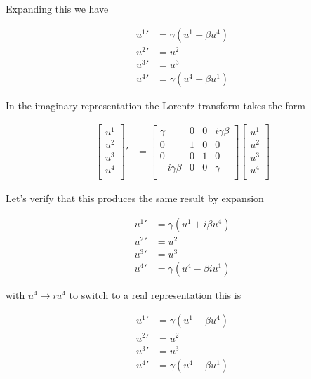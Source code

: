 Expanding this we have

\begin{align}\label{eqn:pauli_four_vector_v:realRepresentationFourVector}
{u^1}' &= \gamma ( u^1 - \beta u^4) \\
{u^2}' &= {u^2} \\
{u^3}' &= {u^3} \\
{u^4}' &= \gamma ( u^4 - \beta u^1)
\end{align}

In the imaginary representation the Lorentz transform takes the form

\begin{align*}
{\begin{bmatrix}
u^1 \\
u^2 \\
u^3 \\
u^4 \\
\end{bmatrix}}'
&=
\begin{bmatrix}
\gamma & 0 & 0 & i \gamma \beta \\
0 & 1 & 0 & 0 \\
0 & 0 & 1 & 0 \\
- i \gamma \beta & 0 & 0 & \gamma \\
\end{bmatrix}
{\begin{bmatrix}
u^1 \\
u^2 \\
u^3 \\
u^4 \\
\end{bmatrix}} 
\end{align*}

Let's verify that this produces the same result by expansion

\begin{align*}
{u^1}' &= \gamma ( u^1 + i \beta u^4) \\
{u^2}' &= {u^2} \\
{u^3}' &= {u^3} \\
{u^4}' &= \gamma ( u^4 - \beta i u^1)
\end{align*}

with $u^4 \rightarrow i u^4$ to switch to a real representation this is

\begin{align*}
{u^1}' &= \gamma ( u^1 - \beta u^4) \\
{u^2}' &= {u^2} \\
{u^3}' &= {u^3} \\
{u^4}' &= \gamma ( u^4 - \beta u^1)
\end{align*}

